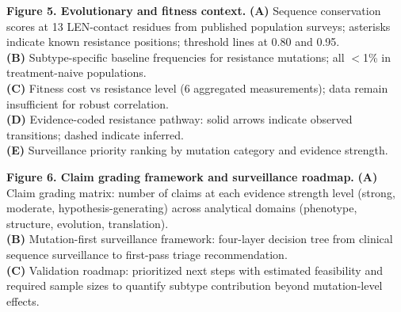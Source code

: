 \documentclass[preprint,authoryear]{elsarticle}
\begin{document}
\textbf{Figure 5. Evolutionary and fitness context.}
\textbf{(A)} Sequence conservation scores at 13 LEN-contact residues from published population surveys; asterisks indicate known resistance positions; threshold lines at 0.80 and 0.95.\\
\textbf{(B)} Subtype-specific baseline frequencies for resistance mutations; all $<$1\% in treatment-naive populations.\\
\textbf{(C)} Fitness cost vs resistance level (6 aggregated measurements); data remain insufficient for robust correlation.\\
\textbf{(D)} Evidence-coded resistance pathway: solid arrows indicate observed transitions; dashed indicate inferred.\\
\textbf{(E)} Surveillance priority ranking by mutation category and evidence strength.

\textbf{Figure 6. Claim grading framework and surveillance roadmap.}
\textbf{(A)} Claim grading matrix: number of claims at each evidence strength level (strong, moderate, hypothesis-generating) across analytical domains (phenotype, structure, evolution, translation).\\
\textbf{(B)} Mutation-first surveillance framework: four-layer decision tree from clinical sequence surveillance to first-pass triage recommendation.\\
\textbf{(C)} Validation roadmap: prioritized next steps with estimated feasibility and required sample sizes to quantify subtype contribution beyond mutation-level effects.
\end{document}
